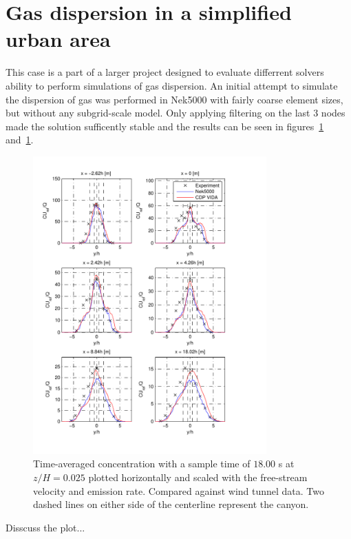 \section{Gas dispersion in a simplified urban area} 
This case is a part of a larger project designed to evaluate differrent solvers 
ability to perform simulations of gas dispersion. An initial attempt to simulate the 
dispersion of gas was performed in Nek5000 with fairly coarse element sizes, but without
any subgrid-scale model. Only applying filtering on the last 3 nodes made the solution 
sufficently stable and the results can be seen in figures~\ref{fig:cHfilter} and~\ref{fig:cHfilter}.
%
\begin{figure}[h]
	\centering
	\includegraphics[width=0.8\textwidth]{Figures/NekcH.pdf}
	\caption{Time-averaged concentration with a sample time of $18.00$ s at $z/H = 0.025$ plotted horizontally and scaled 
	with the free-stream velocity and emission rate. Compared against wind tunnel data.
Two dashed lines on either side of the centerline represent the canyon.}
	\label{fig:cHfilter}
\end{figure}
%
Disscuss the plot... 


